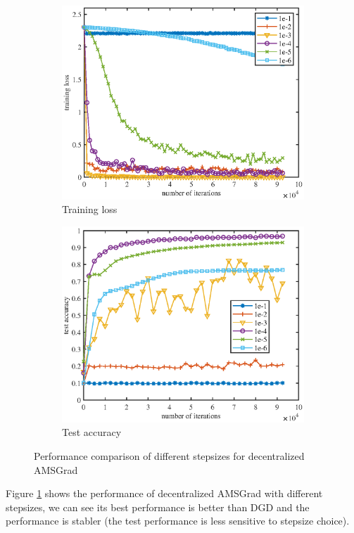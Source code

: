 \documentclass{article} %
\begin{document}
\begin{figure}[h]
\centering
	\begin{subfigure}{.45\textwidth}
	\centering
	\includegraphics[width=.9\textwidth]{figures/amsgrad_train.eps}
	\caption{\small Training loss}
	\end{subfigure}
\begin{subfigure}{.45\textwidth}
	\centering
		\includegraphics[width=.9\textwidth]{figures/amsgrad_test.eps}
	\caption{\small  Test accuracy}
	\end{subfigure}
	\caption{Performance comparison of different stepsizes for decentralized AMSGrad}
	\label{fig: amsgrad_curve}
\end{figure}

Figure \ref{fig: amsgrad_curve} shows the performance of decentralized AMSGrad with different stepsizes, we can see its best performance is better than DGD and the performance is stabler (the test performance is less sensitive to stepsize choice).
\end{document}
